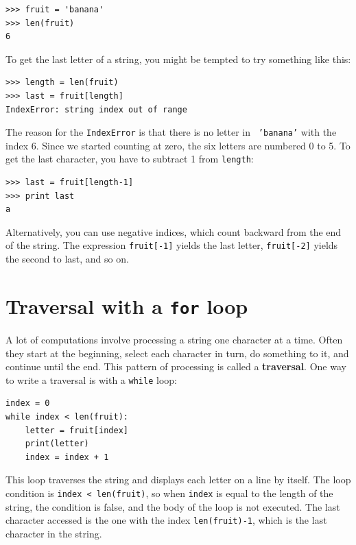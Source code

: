 \documentclass[10pt]{book}
\begin{document}
\beforeverb
\begin{verbatim}
>>> fruit = 'banana'
>>> len(fruit)
6
\end{verbatim}
\afterverb
%
To get the last letter of a string, you might be tempted to try something
like this:


\beforeverb
\begin{verbatim}
>>> length = len(fruit)
>>> last = fruit[length]
IndexError: string index out of range
\end{verbatim}
\afterverb
%
The reason for the {\tt IndexError} is that there is no letter in {\tt
'banana'} with the index 6.  Since we started counting at zero, the
six letters are numbered 0 to 5.  To get the last character, you have
to subtract 1 from {\tt length}:

\beforeverb
\begin{verbatim}
>>> last = fruit[length-1]
>>> print last
a
\end{verbatim}
\afterverb
%
Alternatively, you can use negative indices, which count backward from
the end of the string.  The expression {\tt fruit[-1]} yields the last
letter, {\tt fruit[-2]} yields the second to last, and so on.



\section{Traversal with a {\tt for} loop}
\label{for}


A lot of computations involve processing a string one character at a
time.  Often they start at the beginning, select each character in
turn, do something to it, and continue until the end.  This pattern of
processing is called a {\bf traversal}.  One way to write a traversal
is with a {\tt while} loop:

\beforeverb
\begin{verbatim}
index = 0
while index < len(fruit):
    letter = fruit[index]
    print(letter)
    index = index + 1
\end{verbatim}
\afterverb
%
This loop traverses the string and displays each letter on a line by
itself.  The loop condition is {\tt index < len(fruit)}, so
when {\tt index} is equal to the length of the string, the
condition is false, and the body of the loop is not executed.  The
last character accessed is the one with the index {\tt len(fruit)-1},
which is the last character in the string.
\end{document}
